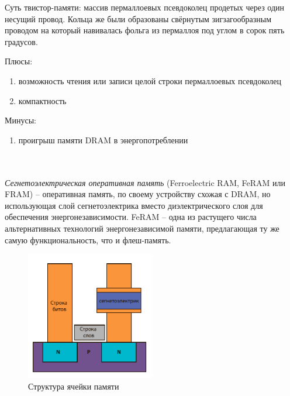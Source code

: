Суть твистор-памяти: массив пермаллоевых псевдоколец продетых через 
один несущий провод. Кольца же были образованы свёрнутым зигзагообразным 
проводом на который навивалась фольга из пермаллоя под углом в сорок пять
градусов.

\hspace{-6ex}\begin{minipage}[h]{0.5\linewidth}
\vspace{5ex}Плюсы:
\begin{enumerate}[noitemsep]
	\item возможность чтения или записи целой строки пермаллоевых псевдоколец 
	\item компактность
\end{enumerate}
\end{minipage}
\begin{minipage}[h]{0.5\linewidth}
Минусы:
\begin{enumerate}[noitemsep]
	\item проигрыш памяти DRAM в энергопотреблении
\end{enumerate}
\end{minipage} \\\\

\emph{Сегнетоэлектрическая оперативная память} (Ferroelectric RAM, FeRAM или 
FRAM) -- оперативная память, по своему устройству схожая с DRAM, но 
использующая слой сегнетоэлектрика вместо диэлектрического слоя для 
обеспечения энергонезависимости. FeRAM -- одна из растущего числа 
альтернативных технологий энергонезависимой памяти, предлагающая ту же 
самую функциональность, что и флеш-память.

\begin{figure}
    \vspace{-2ex}
    \includegraphics[width=0.5\textwidth]{images/image_02}
    \parbox{0.5\textwidth}{\caption{Структура ячейки памяти}}
\end{figure}


